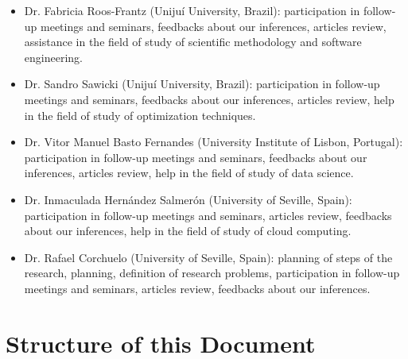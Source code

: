 \begin{itemize}
\item Dr. Fabricia Roos-Frantz (Unijuí University, Brazil): participation in follow-up meetings and seminars, feedbacks about our inferences, articles review, assistance in the field of study of scientific methodology and software engineering.
\item Dr. Sandro Sawicki (Unijuí University, Brazil): participation in follow-up meetings and seminars, feedbacks about our inferences, articles review, help in the field of study of optimization techniques.
\item Dr. Vitor Manuel Basto Fernandes (University Institute of Lisbon, Portugal): participation in follow-up meetings and seminars, feedbacks about our inferences, articles review, help in the field of study of data science.
\item Dr. Inmaculada Hernández Salmerón (University of Seville, Spain): participation in follow-up meetings and seminars, articles review, feedbacks about our inferences, help in the field of study of cloud computing.
\item Dr. Rafael Corchuelo (University of Seville, Spain): planning of steps of the research, planning, definition of research problems, participation in follow-up meetings and seminars, articles review, feedbacks about our inferences.
\end{itemize}
%


\section{Structure of this Document}  
\noindent

